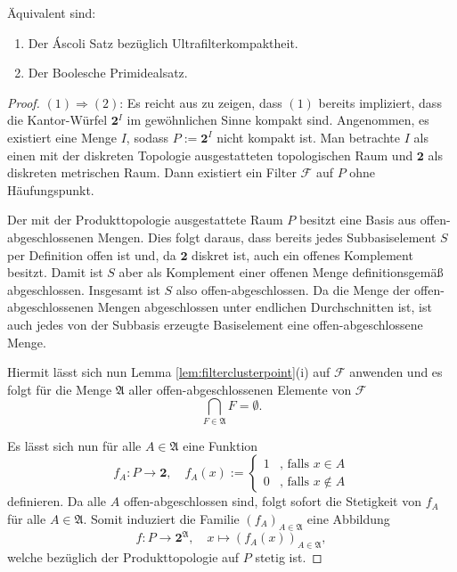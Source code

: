 \begin{thm}
  Äquivalent sind:
  \begin{enumerate}
    \item Der Áscoli Satz bezüglich Ultrafilterkompaktheit.
    \item Der Boolesche Primidealsatz.
  \end{enumerate}
\end{thm}

\begin{proof}
  $(1)\Rightarrow(2) $: Es reicht aus zu zeigen, dass $(1)$ bereits impliziert, dass die Kantor-Würfel $\mathbf{2}^I$ im gewöhnlichen Sinne kompakt sind.
  Angenommen, es existiert eine Menge $I$, sodass $P:= \mathbf{2}^I$ nicht kompakt ist.
  Man betrachte $I$ als einen mit der diskreten Topologie ausgestatteten topologischen Raum und $\mathbf{2}$ als diskreten metrischen Raum.
  Dann existiert ein Filter $\mathcal{F}$ auf $P$ ohne Häufungspunkt.

  Der mit der Produkttopologie ausgestattete Raum $P$ besitzt eine Basis aus offen-ab\-ge\-schlossenen Mengen.
  Dies folgt daraus, dass bereits jedes Subbasiselement $S$ per Definition offen ist und, da $\mathbf{2}$ diskret ist, auch ein offenes Komplement besitzt.
  Damit ist $S$ aber als Komplement einer offenen Menge definitionsgemäß abgeschlossen.
  Insgesamt ist $S$ also offen-abgeschlossen.
  Da die Menge der offen-abgeschlossenen Mengen abgeschlossen unter endlichen Durchschnitten ist, ist auch jedes von der Subbasis erzeugte Basiselement eine offen-abgeschlossene Menge.

  Hiermit lässt sich nun Lemma \ref{lem:filterclusterpoint}(i) auf $\mathcal{F}$ anwenden und es folgt für die Menge $\mathfrak{A}$ aller offen-abgeschlossenen Elemente von $\mathcal{F}$
  \begin{displaymath}
    \bigcap_{F \in \mathfrak{A}} F = \emptyset \tag{$\ast$}.
  \end{displaymath}

  Es lässt sich nun für alle $A \in \mathfrak{A}$ eine Funktion
  \begin{displaymath}
    f_A \colon P \to \mathbf{2}, \quad
    f_A(x) := 
    \begin{cases}
      1 &\text{, falls } x \in A \\
      0 &\text{, falls } x \not\in A
    \end{cases}
  \end{displaymath}
  definieren.
  Da alle $A$ offen-abgeschlossen sind, folgt sofort die Stetigkeit von $f_A$ für alle $A \in \mathfrak{A}$.
  Somit induziert die Familie $(f_A)_{A \in \mathfrak{A}}$ eine Abbildung 
  \begin{displaymath}
    f \colon P \to \mathbf{2}^\mathfrak{A}, \quad
    x \mapsto (f_A(x))_{A \in \mathfrak{A}},
  \end{displaymath}
  welche bezüglich der Produkttopologie auf $P$ stetig ist.


\end{proof}
